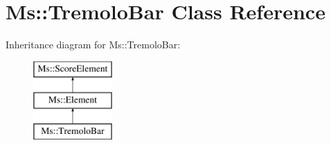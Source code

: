 \hypertarget{class_ms_1_1_tremolo_bar}{}\section{Ms\+:\+:Tremolo\+Bar Class Reference}
\label{class_ms_1_1_tremolo_bar}
Inheritance diagram for Ms\+:\+:Tremolo\+Bar\+:\begin{figure}[H]
\begin{center}
\leavevmode
\includegraphics[height=3.000000cm]{class_ms_1_1_tremolo_bar}
\end{center}
\end{figure}
